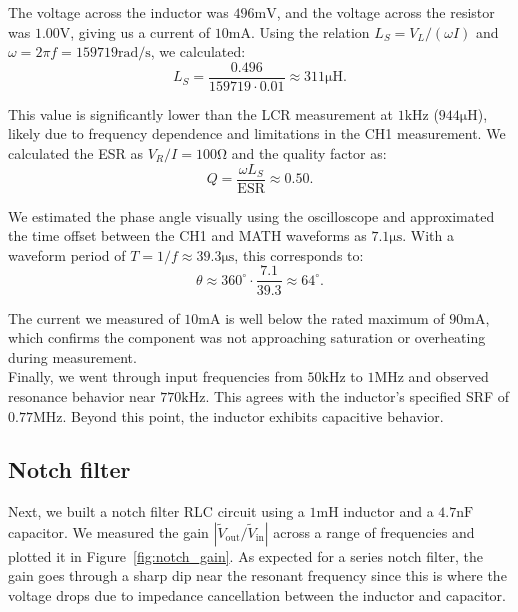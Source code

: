 \documentclass{article}
\begin{document}
\noindent The voltage across the inductor was $496\si{\milli\volt}$, and the voltage
across the resistor was $1.00\si{\volt}$, giving us a current of $10\si{\milli\ampere}$.
Using the relation $L_S = V_L/ (\omega I)$ and $\omega=2\pi f=159719\si{\radian} / \si{\second}$,
we calculated:
\begin{equation}
    L_S = \frac{0.496}{159719\cdot 0.01}\approx 311\si{\micro\henry}.
\end{equation}

\noindent This value is significantly lower than the LCR measurement at $1\si{\kilo\hertz}$
($944\si{\micro\henry}$), likely due to frequency dependence and limitations in
the CH1 measurement. We calculated the ESR as $V_R / I=100\si{\ohm}$ and the quality
factor as:
\begin{equation}
    Q=\frac{\omega L_S}{\text{ESR}}\approx 0.50.
\end{equation}

\noindent We estimated the phase angle visually using the oscilloscope and approximated
the time offset between the CH1 and MATH waveforms as $7.1\si{\micro\second}$.
With a waveform period of $T=1/f\approx 39.3\si{\micro\second}$, this
corresponds to:
\begin{equation}
    \theta \approx 360^\circ \cdot \frac{7.1}{39.3}\approx 64^\circ.
\end{equation}

\noindent The current we measured of $10\si{\milli\ampere}$ is well below the rated
maximum of $90\si{\milli\ampere}$, which confirms the component was not
approaching saturation or overheating during measurement.\\

\noindent Finally, we went through input frequencies from $50\si{\kilo\hertz}$ to
$1\si{\mega\hertz}$ and observed resonance behavior near $770\si{\kilo\hertz}$.
This agrees with the inductor's specified SRF of $0.77\si{\mega\hertz}$. Beyond
this point, the inductor exhibits capacitive behavior.


\subsection{Notch filter}

\noindent Next, we built a notch filter RLC circuit using a $1\si{\milli\henry}$ inductor
and a $4.7\si{\nano\farad}$ capacitor. We measured the gain $|\widetilde{V}_\text{out} / \widetilde{V}_\text{in}|$
across a range of frequencies and plotted it in Figure~\ref{fig:notch_gain}.
As expected for a series notch filter, the gain goes through a sharp dip near
the resonant frequency since this is where the voltage drops due to impedance
cancellation between the inductor and capacitor.
\end{document}
